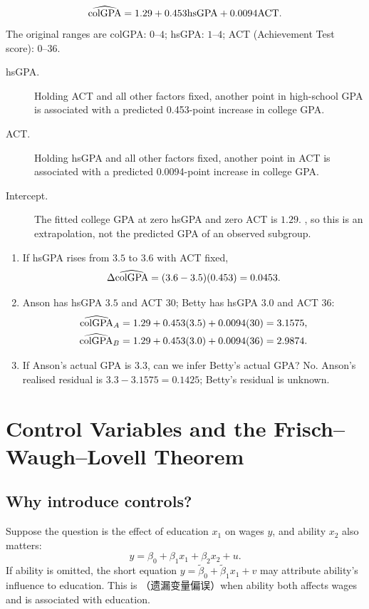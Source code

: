 \begin{example}\label{ex:gpa}
\[\widehat{\mathrm{colGPA}}=1.29+0.453\mathrm{hsGPA}+0.0094\mathrm{ACT}.\]
The original ranges are colGPA: $0$--$4$; hsGPA: $1$--$4$; ACT (Achievement Test score): $0$--$36$.
\begin{description}
\item[hsGPA.] Holding ACT and all other factors fixed, another point in high-school GPA is associated with a predicted 0.453-point increase in college GPA.
\item[ACT.] Holding hsGPA and all other factors fixed, another point in ACT is associated with a predicted 0.0094-point increase in college GPA.
\item[Intercept.] The fitted college GPA at zero hsGPA and zero ACT is $1.29$. , so this is an extrapolation, not the predicted GPA of an observed subgroup.
\end{description}
\begin{enumerate}
\item If hsGPA rises from $3.5$ to $3.6$ with ACT fixed,
\[\Delta\widehat{\mathrm{colGPA}}=(3.6-3.5)(0.453)=0.0453.\]
\item Anson has hsGPA $3.5$ and ACT $30$; Betty has hsGPA $3.0$ and ACT $36$:
\begin{align*}
\widehat{\mathrm{colGPA}}_{A}&=1.29+0.453(3.5)+0.0094(30)=3.1575,\\
\widehat{\mathrm{colGPA}}_{B}&=1.29+0.453(3.0)+0.0094(36)=2.9874.
\end{align*}
\item If Anson's actual GPA is $3.3$, can we infer Betty's actual GPA? No.  Anson's realised residual is $3.3-3.1575=0.1425$; Betty's residual is unknown.
\end{enumerate}
\end{example}


\section{Control Variables and the Frisch--Waugh--Lovell Theorem}
\label{sec:fwl-week2}
\subsection{Why introduce controls?}
Suppose the question is the effect of education $x_1$ on wages $y$, and ability $x_2$ also matters:
\[y=\beta_0+\beta_1x_1+\beta_2x_2+u.\]
If ability is omitted, the short equation $y=\tilde\beta_0+\tilde\beta_1x_1+v$ may attribute ability's influence to education. This is （遗漏变量偏误）when ability both affects wages and is associated with education.


